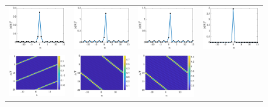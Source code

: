 \documentclass{article}
\begin{document}
\begin{figure}[H]
    \centering
    \begin{tabular}{cccc}
    \includegraphics[width=4cm]{leftsol} &
    \includegraphics[width=4cm]{rightsol} &
    \includegraphics[width=4cm]{right0sol} &
    \includegraphics[width=4cm]{statsol} \\
    \includegraphics[width=4cm]{leftcolormap} &
    \includegraphics[width=4cm]{rightcolormap} &
    \includegraphics[width=4cm]{right0colormap} &

\end{tabular}
\end{figure}
\end{document}
